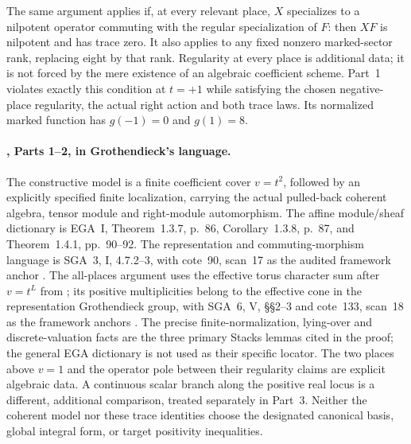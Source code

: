 The same argument applies if, at every relevant place,
$X$ specializes to a nilpotent operator commuting
with the regular specialization of $F$:
then $XF$ is nilpotent and has trace zero.
It also applies to any fixed nonzero marked-sector
rank, replacing eight by that rank.
Regularity at every place is additional data;
it is not forced by the mere existence of an
algebraic coefficient scheme.
Part~1 violates exactly this condition at $t=+1$
while satisfying the chosen negative-place
regularity, the actual right action and both
trace laws. Its normalized marked function has
$g(-1)=0$ and $g(1)=8$.

\paragraph{, Parts 1--2, in Grothendieck's language.}
The constructive model is a finite coefficient cover
$v=t^2$, followed by an explicitly specified finite
localization, carrying the actual pulled-back
coherent algebra, tensor module and right-module
automorphism.
The affine module/sheaf dictionary is EGA~I,
Theorem~1.3.7, p.~86, Corollary~1.3.8, p.~87,
and Theorem~1.4.1, pp.~90--92.
The representation and commuting-morphism language
is SGA~3, I, 4.7.2--3, with cote~90, scan~17 as the
audited framework anchor \cite{EGA,SGA3,Archive}.
The all-places argument uses the effective torus
character sum after $v=t^L$ from ;
its positive multiplicities belong to the effective
cone in the representation Grothendieck group,
with SGA~6, V, \S\S2--3 and cote~133, scan~18 as
the framework anchors \cite{SGA6,Archive}.
The precise finite-normalization, lying-over and
discrete-valuation facts are the three primary
Stacks lemmas cited in the proof; the general
EGA dictionary is not used as their specific locator.
The two places above $v=1$ and the operator pole
between their regularity claims are explicit
algebraic data.
A continuous scalar branch along the positive real
locus is a different, additional comparison,
treated separately in Part~3.
Neither the coherent model nor these trace identities
choose the designated canonical basis, global
integral form, or target positivity inequalities.


